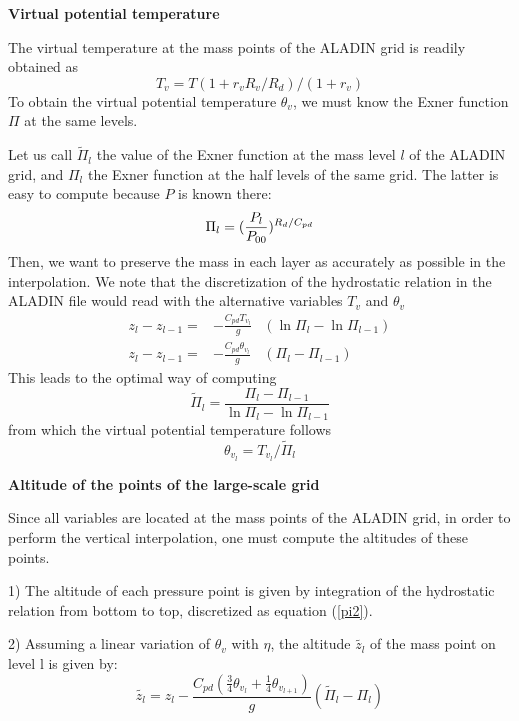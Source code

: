 {\bf Virtual potential temperature}

The virtual temperature at the mass points of the ALADIN grid is readily obtained
as
\begin{equation}
T_v= T  (1+r_v R_v/R_d)/(1+r_v)
\end{equation}
To obtain the virtual potential temperature $\theta_v$, we must know the
Exner function $\Pi$ at the same levels.

Let us call $\tilde{\Pi}_l$ the
value of the Exner function at the mass level $l$ of the ALADIN grid, and
$\Pi_l$ the Exner function at the half levels of the same grid. The
latter is easy to compute because $P$ is known there:
\begin{equation}
\Pi_l= ({ P_l \over P_{00} })^{ R_d / C_{pd}}
\end{equation}
Then, we want to preserve the mass in each layer as accurately as possible
in the interpolation. We note that the discretization of the
hydrostatic relation in the ALADIN file would read with the alternative
variables $T_v$ and $\theta_v$
\begin{eqnarray}
\label{pi1}
z_l-z_{l-1}=&-\frac{C_{pd}T_{v_l}}{g}&(\ln\Pi_l-\ln\Pi_{l-1})\\
\label{pi2}
z_l-z_{l-1}=&-\frac{C_{pd}\theta_{v_l}}{g}&(\Pi_l-\Pi_{l-1})
\end{eqnarray}
This leads to the optimal way of computing
\begin{equation}
\tilde\Pi_l=\frac{\Pi_l-\Pi_{l-1}}{\ln\Pi_l-\ln\Pi_{l-1}}
\end{equation}
from which the virtual potential temperature follows
\begin{equation}
\theta_{v_l} = T_{v_l} / \tilde{\Pi}_l
\end{equation}

{\bf Altitude of the points of the large-scale grid}

Since all variables are located at the mass points of the ALADIN grid,
in order to perform the vertical interpolation, one must compute the
altitudes of these points.

1) The altitude of each pressure point is given by integration
of the hydrostatic relation from bottom to top, discretized as equation
(\ref{pi2}).

2) Assuming a linear variation of $\theta_v$ with $\eta$,
the altitude $\tilde{z_l}$
of the mass point on level l is given by:
\begin{equation}
\tilde{z_l}=z_l-\frac{C_{pd}\left( \frac{3}{4}\theta_{v_l}
+\frac{1}{4}\theta_{v_{l+1}}\right)}{g}(\tilde\Pi_l-\Pi_l)
\end{equation}

